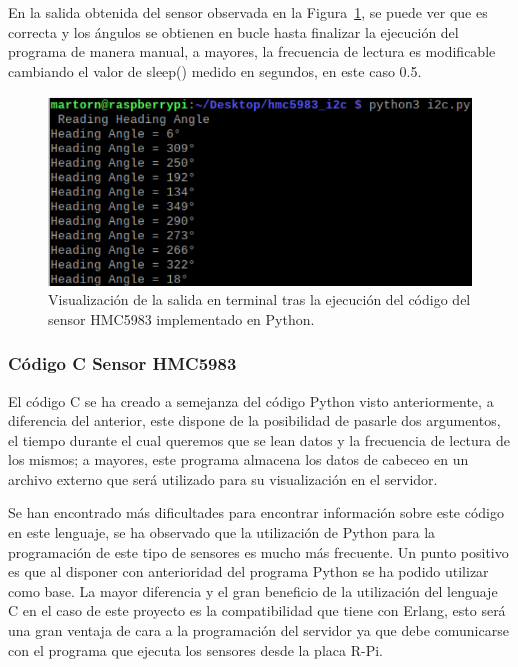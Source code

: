 En la salida obtenida del sensor observada en la Figura~\ref{fig:salidaHMCP}, se puede ver que es correcta y los ángulos se obtienen en bucle hasta finalizar la ejecución del programa de manera manual, a mayores, la frecuencia de lectura es modificable cambiando el valor de sleep() medido en segundos, en este caso 0.5. 

\begin{figure}[th]
\centering
\includegraphics{images/salidaHMC5983Python.png}
\caption[Salida código Python sensor HMC5983]{Visualización de la salida en terminal tras la ejecución del código del sensor HMC5983 implementado en Python.}%
\label{fig:salidaHMCP}
\end{figure}

\subsubsection{Código C Sensor HMC5983}

El código C se ha creado a semejanza del código Python visto anteriormente, a diferencia del anterior, este dispone de la posibilidad de pasarle dos argumentos, el tiempo durante el cual queremos que se lean datos y la frecuencia de lectura de los mismos; a mayores, este programa almacena los datos de cabeceo en un archivo externo que será utilizado para su visualización en el servidor.

Se han encontrado más dificultades para encontrar información sobre este código en este lenguaje, se ha observado que la utilización de Python para la programación de este tipo de sensores es mucho más frecuente. Un punto positivo es que al disponer con anterioridad del programa Python se ha podido utilizar como base. La mayor diferencia y el gran beneficio de la utilización del lenguaje C en el caso de este proyecto es la compatibilidad que tiene con Erlang, esto será una gran ventaja de cara a la programación del servidor ya que debe comunicarse con el programa que ejecuta los sensores desde la placa R-Pi.

